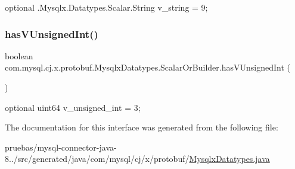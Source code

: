 {\ttfamily optional .Mysqlx.\+Datatypes.\+Scalar.\+String v\+\_\+string = 9;} \mbox{\label{interfacecom_1_1mysql_1_1cj_1_1x_1_1protobuf_1_1_mysqlx_datatypes_1_1_scalar_or_builder_a90769b1f811e80e2769df5e7c6b87221}} 
\subsubsection{\texorpdfstring{has\+V\+Unsigned\+Int()}{hasVUnsignedInt()}}
{\footnotesize\ttfamily boolean com.\+mysql.\+cj.\+x.\+protobuf.\+Mysqlx\+Datatypes.\+Scalar\+Or\+Builder.\+has\+V\+Unsigned\+Int (\begin{DoxyParamCaption}{ }\end{DoxyParamCaption})}

{\ttfamily optional uint64 v\+\_\+unsigned\+\_\+int = 3;} 

The documentation for this interface was generated from the following file\+:\begin{DoxyCompactItemize}
\item 
pruebas/mysql-\/connector-\/java-\/8../src/generated/java/com/mysql/cj/x/protobuf/\mbox{\hyperlink{_mysqlx_datatypes_8java}{Mysqlx\+Datatypes.\+java}}\end{DoxyCompactItemize}
